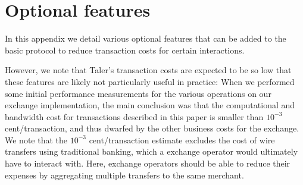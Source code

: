\documentclass{llncs}
\begin{document}







\newpage
\appendix

\section{Optional features}

In this appendix we detail various optional features that can
be added to the basic protocol to reduce transaction costs for
certain interactions.

However, we note that Taler's transaction costs are expected to be so
low that these features are likely not particularly useful in
practice: When we performed some initial performance measurements for
the various operations on our exchange implementation, the main conclusion
was that the computational and bandwidth cost for transactions
described in this paper is smaller than $10^{-3}$ cent/transaction,
and thus dwarfed by the other business costs for the exchange.  We note
that the $10^{-3}$ cent/transaction estimate excludes the cost of wire
transfers using traditional banking, which a exchange operator would
ultimately have to interact with.  Here, exchange operators should be able
to reduce their expenses by aggregating multiple transfers to the same
merchant.
\end{document}
